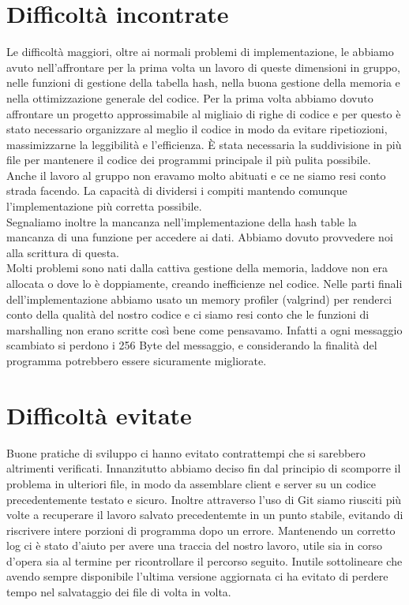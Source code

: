 \documentclass[a4paper, 11pt]{article} %
\begin{document}
\section*{Difficoltà incontrate}
Le difficoltà maggiori, oltre ai normali problemi di implementazione, le abbiamo avuto nell'affrontare per la prima volta un lavoro di queste dimensioni in gruppo, nelle funzioni di gestione della tabella hash, nella buona gestione della memoria e nella ottimizzazione generale del codice.
Per la prima volta abbiamo dovuto affrontare un progetto approssimabile al migliaio di righe di codice e per questo è stato necessario organizzare al meglio il codice in modo da evitare ripetiozioni, massimizzarne la leggibilità e l'efficienza. È stata necessaria la suddivisione in più file per mantenere il codice dei programmi principale il più pulita possibile.\\
Anche il lavoro al gruppo non eravamo molto abituati e ce ne siamo resi conto strada facendo. La capacità di dividersi i compiti mantendo comunque l'implementazione più corretta possibile.\\
Segnaliamo inoltre la mancanza nell'implementazione della hash table la mancanza di una funzione per accedere ai dati. Abbiamo dovuto provvedere noi alla scrittura di questa.\\
Molti problemi sono nati dalla cattiva gestione della memoria, laddove non era allocata o dove lo è doppiamente, creando inefficienze nel codice. Nelle parti finali dell'implementazione abbiamo usato un memory profiler (valgrind) per renderci conto della qualità del nostro codice e ci siamo resi conto che le funzioni di marshalling non erano scritte così bene come pensavamo. Infatti a ogni messaggio scambiato si perdono i 256 Byte del messaggio, e considerando la finalità del programma potrebbero essere sicuramente migliorate.

\section*{Difficoltà evitate}
Buone pratiche di sviluppo ci hanno evitato contrattempi che si sarebbero altrimenti verificati. Innanzitutto abbiamo deciso fin dal principio di scomporre il problema in ulteriori file, in modo da assemblare client e server su un codice precedentemente testato e sicuro. Inoltre attraverso l'uso di Git siamo riusciti più volte a recuperare il lavoro salvato precedentemte in un punto stabile, evitando di riscrivere intere porzioni di programma dopo un errore. Mantenendo un corretto log ci è stato d'aiuto per avere una traccia del nostro lavoro, utile sia in corso d'opera sia al termine per ricontrollare il percorso seguito. Inutile sottolineare che avendo sempre disponibile l'ultima versione aggiornata ci ha evitato di perdere tempo nel salvataggio dei file di volta in volta.
\end{document}
